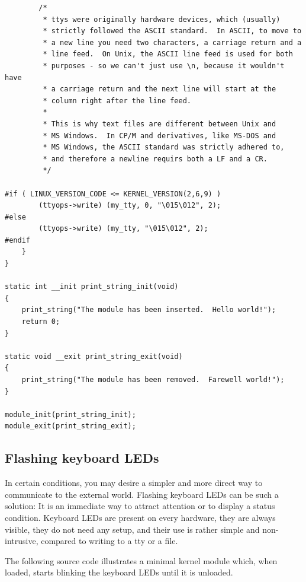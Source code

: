 \documentclass[11pt]{article}
\begin{document}
\begin{verbatim}
        /*
         * ttys were originally hardware devices, which (usually)
         * strictly followed the ASCII standard.  In ASCII, to move to
         * a new line you need two characters, a carriage return and a
         * line feed.  On Unix, the ASCII line feed is used for both
         * purposes - so we can't just use \n, because it wouldn't have
         * a carriage return and the next line will start at the
         * column right after the line feed.
         *
         * This is why text files are different between Unix and
         * MS Windows.  In CP/M and derivatives, like MS-DOS and
         * MS Windows, the ASCII standard was strictly adhered to,
         * and therefore a newline requirs both a LF and a CR.
         */

#if ( LINUX_VERSION_CODE <= KERNEL_VERSION(2,6,9) )
        (ttyops->write) (my_tty, 0, "\015\012", 2);
#else
        (ttyops->write) (my_tty, "\015\012", 2);
#endif
    }
}

static int __init print_string_init(void)
{
    print_string("The module has been inserted.  Hello world!");
    return 0;
}

static void __exit print_string_exit(void)
{
    print_string("The module has been removed.  Farewell world!");
}

module_init(print_string_init);
module_exit(print_string_exit);
\end{verbatim}

\subsection*{Flashing keyboard LEDs}
\label{sec-13-2}
In certain conditions, you may desire a simpler and more direct way to communicate to the external world. Flashing keyboard LEDs can be such a solution: It is an immediate way to attract attention or to display a status condition. Keyboard LEDs are present on every hardware, they are always visible, they do not need any setup, and their use is rather simple and non-intrusive, compared to writing to a tty or a file.

The following source code illustrates a minimal kernel module which, when loaded, starts blinking the keyboard LEDs until it is unloaded.
\end{document}
